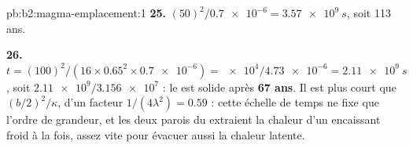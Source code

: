 \begin{solution}{pb:b2:magma-emplacement:1}
\textbf{25.} $(50)^2/\num{0.7e-6} = \qty{3.57e9}{s}$, soit 113 ans.

\textbf{26.} $t = (100)^2/(16\times0.65^2\times\num{0.7e-6}) = \num{e4}/\num{4.73e-6} =
\qty{2.11e9}{s}$, soit $\num{2.11e9}/\num{3.156e7}$ : le  est solide après
\textbf{\qty[text-series-to-math=true]{67}{} ans}. Il est plus court que
$(b/2)^2/\kappa$, d'un facteur $1/(4\lambda^2) = 0.59$ : cette échelle de temps ne fixe que
l'ordre de grandeur, et les deux parois du  extraient la chaleur d'un encaissant froid à
la fois, assez vite pour évacuer aussi la chaleur latente.
\end{solution}
